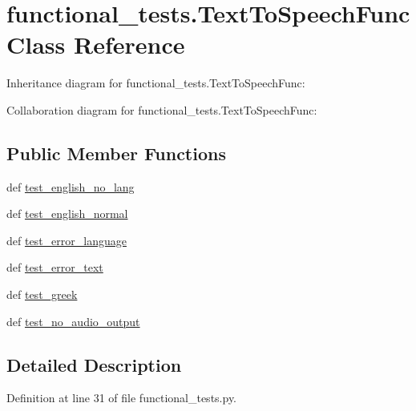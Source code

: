 \hypertarget{classfunctional__tests_1_1TextToSpeechFunc}{\section{functional\-\_\-tests.\-Text\-To\-Speech\-Func Class Reference}
\label{classfunctional__tests_1_1TextToSpeechFunc}
}


Inheritance diagram for functional\-\_\-tests.\-Text\-To\-Speech\-Func\-:


Collaboration diagram for functional\-\_\-tests.\-Text\-To\-Speech\-Func\-:
\subsection*{Public Member Functions}
\begin{DoxyCompactItemize}
\item 
def \hyperlink{classfunctional__tests_1_1TextToSpeechFunc_ae7b36b9901a15a0e1d74e35454bca983}{test\-\_\-english\-\_\-no\-\_\-lang}
\item 
def \hyperlink{classfunctional__tests_1_1TextToSpeechFunc_a83f2f8743207fb07c015526571a1d078}{test\-\_\-english\-\_\-normal}
\item 
def \hyperlink{classfunctional__tests_1_1TextToSpeechFunc_a035fd1ce8a10f540ee240b7e48ccfe14}{test\-\_\-error\-\_\-language}
\item 
def \hyperlink{classfunctional__tests_1_1TextToSpeechFunc_a643d86fe1d9136f15b1fdf07a96d6d38}{test\-\_\-error\-\_\-text}
\item 
def \hyperlink{classfunctional__tests_1_1TextToSpeechFunc_a3ea6933263d83e40893753e2b1ec4526}{test\-\_\-greek}
\item 
def \hyperlink{classfunctional__tests_1_1TextToSpeechFunc_af0ee5a0b185ccb078018a9440042133e}{test\-\_\-no\-\_\-audio\-\_\-output}
\end{DoxyCompactItemize}


\subsection{Detailed Description}


Definition at line 31 of file functional\-\_\-tests.\-py.



